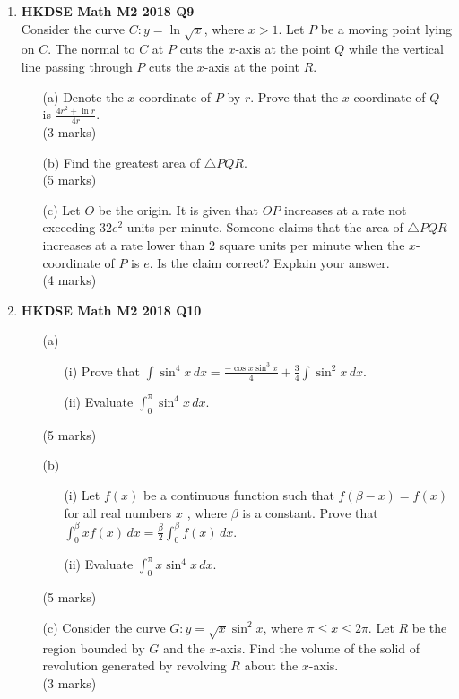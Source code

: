 \documentclass[12pt]{article}
\begin{document}
\begin{enumerate}
	\item \textbf{HKDSE Math M2 2018 Q9}\\
	Consider the curve $C : y = \displaystyle\ln \sqrt{x}$, where $x > 1$. Let $P$ be a moving point lying on $C$. The normal to $C$ at $P$ cuts the $x$-axis at the point $Q$ while the vertical line passing through $P$ cuts the $x$-axis at the point $R$.  
	\begin{enumerate}
		\item [(a)]Denote the $x$-coordinate of $P$ by $r$. Prove that the $x$-coordinate of $Q$ is $\displaystyle\frac{4r^2+\ln r}{4r}$.  \\(3 marks)
		\item [(b)]Find the greatest area of $\triangle PQR$. \\(5 marks) 
		\item [(c)]Let $O$ be the origin. It is given that $OP$ increases at a rate not exceeding $32e^2$ units per minute. Someone claims that the area of $\triangle PQR$ increases at a rate lower than $2$ square units per minute when the $x$-coordinate of $P$ is $e$. Is the claim correct? Explain your answer. \\(4 marks) 
	\end{enumerate}

	\item \textbf{HKDSE Math M2 2018 Q10}
	\begin{enumerate}
		\item [(a)] 
		\begin{enumerate}
			\item [(i)]Prove that $\displaystyle \int \sin^4{x}\,dx = \frac{-\cos{x}\sin^3{x}}{4} + \frac{3}{4} \int \sin^2{x} \,dx$. 
			\item [(ii)] Evaluate $\displaystyle \int_{0}^{\pi} \sin^4{x}\,dx$.
		\end{enumerate}
		(5 marks)
		\item [(b)] 
		\begin{enumerate}
			\item [(i)]Let $f(x)$ be a continuous function such that $f(\beta - x)= f(x)$ for all real numbers $x$ , where $\beta$ is a constant. Prove that $\displaystyle\int_{0}^{\beta} x f(x) \,dx = \frac{\beta}{2} \int_{0}^{\beta } f(x) \,dx$.
			\item [(ii)] Evaluate $\displaystyle \int_{0}^{\pi} x\sin^4{x}\,dx$.
		\end{enumerate}
		(5 marks)
	\item [(c)]Consider the curve $G : y = \displaystyle \sqrt{x}\sin^2{x}$, where $\pi \leq x \leq 2\pi $. Let $R$ be the region bounded by $G$ and the $x$-axis. Find the volume of the solid of revolution generated by revolving $R$ about the $x$-axis. \\(3 marks) 
	\end{enumerate}


\end{enumerate}
\end{document}
